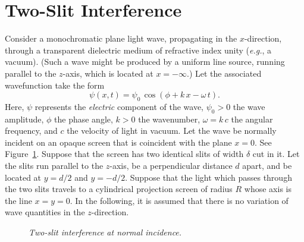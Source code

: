 \section{Two-Slit Interference}\label{s11.2}
Consider a monochromatic plane light wave, propagating in the $x$-direction, through a transparent
dielectric medium of refractive index unity ({\em e.g.}, a vacuum). (Such a wave might be produced by a uniform line
source, running parallel to the $z$-axis, which is located at $x=-\infty$.)
Let the associated wavefunction take the form
\begin{equation}\label{e11.0}
\psi(x,t) = \psi_0\,\cos(\phi+k\,x-\omega\,t).
\end{equation}
Here, $\psi$ represents the {\em electric}\/ component of the wave, $\psi_0>0$ the wave amplitude, $\phi$ the
phase angle,
$k>0$  the wavenumber, $\omega=k\,c$ the angular frequency, and $c$ the velocity of light in vacuum.
Let the wave be normally incident on an opaque
screen that is coincident with the plane $x=0$. See Figure~\ref{f11.1}.
Suppose that the screen has two identical
 slits of width $\delta$ cut in it. Let the slits run parallel to the $z$-axis,  be a perpendicular distance $d$ apart, and be located at $y=d/2$ and $y=-d/2$. Suppose that the
light which passes through the two slits travels to a cylindrical projection screen of radius $R$ whose axis is the line $x=y=0$. In the
following, it is assumed that there is no variation of wave quantities in the $z$-direction.

\begin{figure}
\epsfysize=3.5in
\centerline{}
\caption{\em Two-slit interference at normal incidence.}\label{f11.1}   
\end{figure}

